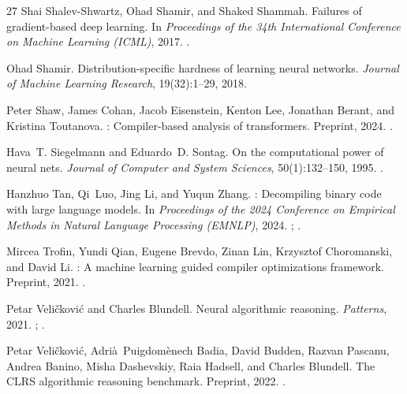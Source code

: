 \documentclass[11pt]{article}
\begin{document}
\begin{thebibliography}{27}
Shai Shalev-Shwartz, Ohad Shamir, and Shaked Shammah.
\newblock Failures of gradient-based deep learning.
\newblock In \emph{Proceedings of the 34th International Conference on Machine Learning (ICML)}, 2017.
\newblock {}.

Ohad Shamir.
\newblock Distribution-specific hardness of learning neural networks.
\newblock \emph{Journal of Machine Learning Research}, 19(32):1--29, 2018.

Peter Shaw, James Cohan, Jacob Eisenstein, Kenton Lee, Jonathan Berant, and Kristina Toutanova.
: Compiler-based analysis of transformers.
\newblock Preprint, 2024.
\newblock {}.

Hava~T. Siegelmann and Eduardo~D. Sontag.
\newblock On the computational power of neural nets.
\newblock \emph{Journal of Computer and System Sciences}, 50(1):132--150, 1995.
\newblock {}.

Hanzhuo Tan, Qi~Luo, Jing Li, and Yuqun Zhang.
: Decompiling binary code with large language models.
\newblock In \emph{Proceedings of the 2024 Conference on Empirical Methods in Natural Language Processing (EMNLP)}, 2024.
\newblock {}; .

Mircea Trofin, Yundi Qian, Eugene Brevdo, Zinan Lin, Krzysztof Choromanski, and David Li.
: A machine learning guided compiler optimizations framework.
\newblock Preprint, 2021.
\newblock {}.

Petar Veli{\v{c}}kovi{\'c} and Charles Blundell.
\newblock Neural algorithmic reasoning.
\newblock \emph{Patterns}, 2021.
\newblock {}; .

Petar Veli{\v{c}}kovi{\'c}, Adri{\`a}~Puigdom{\`e}nech Badia, David Budden, Razvan Pascanu, Andrea Banino, Misha Dashevskiy, Raia Hadsell, and Charles Blundell.
\newblock The {CLRS} algorithmic reasoning benchmark.
\newblock Preprint, 2022.
\newblock {}.


\end{thebibliography}
\end{document}
